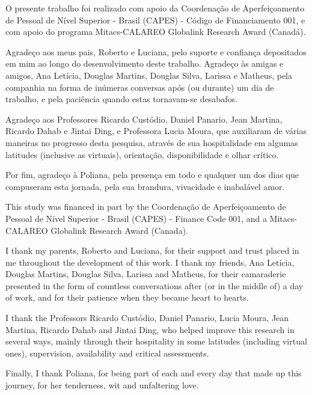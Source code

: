 \documentclass[english]{ufsc-thesis-rn46-2019/ufsc-thesis-rn46-2019}
\theoremstyle{definition}
\begin{document}
\pretextual%
\imprimircapa%
\imprimirfolhaderosto*
\protect{}
\imprimirfolhadecertificacao%

\begin{agradecimentos}
  O presente trabalho foi realizado com apoio da Coordenação de Aperfeiçoamento
  de Pessoal de Nível Superior - Brasil (CAPES) - Código de Financiamento 001,
  e com apoio do programa Mitacs-CALAREO Globalink Research Award (Canadá).

  Agradeço aos meus pais, Roberto e Luciana, pelo suporte e confiança
  depositados em mim ao longo do desenvolvimento deste trabalho. Agradeço às
  amigas e amigos, Ana Letícia, Douglas Martins, Douglas Silva, Larissa e
  Matheus, pela companhia na forma de inúmeras conversas após (ou durante) um
  dia de trabalho, e pela paciência quando estas tornavam-se desabafos.

  Agradeço aos Professores Ricardo Custódio, Daniel Panario, Jean Martina,
  Ricardo Dahab e Jintai Ding, e Professora Lucia Moura, que auxiliaram de
  várias maneiras no progresso desta pesquisa, através de sua hospitalidade em
  algumas latitudes (inclusive as virtuais), orientação, disponibilidade e
  olhar crítico.

  Por fim, agradeço à Poliana, pela presença em todo e qualquer um dos dias que
  compuseram esta jornada, pela sua brandura, vivacidade e inabalável amor.

  \vspace{1cm}

  This study was financed in part by the Coordenação de Aperfeiçoamento de
  Pessoal de Nível Superior - Brasil (CAPES) - Finance Code 001, and
  a Mitacs-CALAREO Globalink Research Award (Canada).

  I thank my parents, Roberto and Luciana, for their support and trust placed
  in me throughout the development of this work. I thank my friends, Ana
  Letícia, Douglas Martins, Douglas Silva, Larissa and Matheus, for their
  camaraderie presented in the form of countless conversations after (or in the
  middle of) a day of work, and for their patience when they became heart to
  hearts.

  I thank the Professors Ricardo Custódio, Daniel Panario, Lucia Moura, Jean
  Martina, Ricardo Dahab and Jintai Ding, who helped improve this research in
  several ways, mainly through their hospitality in some latitudes (including
  virtual ones), supervision, availability and critical assessments.

  Finally, I thank Poliana, for being part of each and every day that made up
  this journey, for her tenderness, wit and unfaltering love.
\end{agradecimentos}
\end{document}

